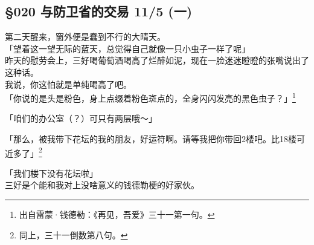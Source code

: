 \subsection{§020 与防卫省的交易 11/5 (一)}

第二天醒来，窗外便是蠢到不行的大晴天。\\

「望着这一望无际的蓝天，总觉得自己就像一只小虫子一样了呢」\\

昨天的慰劳会上，三好喝葡萄酒喝高了烂醉如泥，现在一脸迷迷瞪瞪的张嘴说出了这种话。\\

我说，你这怕就是单纯喝高了吧。\\

「你说的是头是粉色，身上点缀着粉色斑点的，全身闪闪发亮的黑色虫子？」\footnote{出自雷蒙·钱德勒：《再见，吾爱》三十一第一句。}

「咱们的办公室（？）可只有两层哦～」

「那么，被我带下花坛的我的朋友，好运符啊。请等我把你带回2楼吧。比18楼可近多了」\footnote{同上，三十一倒数第八句。}

「我们楼下没有花坛啦」\\

三好是个能和我对上没啥意义的钱德勒梗的好家伙。\\


